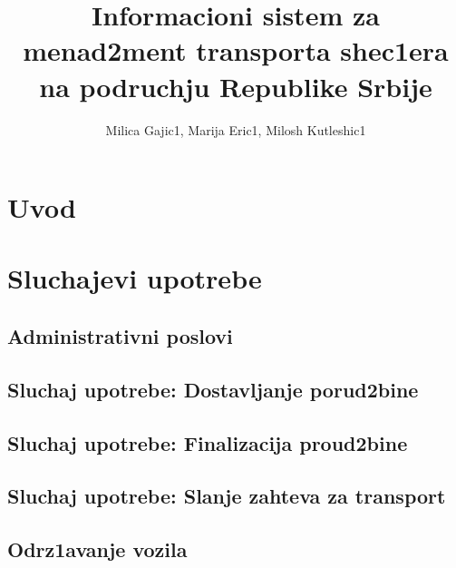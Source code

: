 \documentclass{article}
\title{Informacioni sistem za menad2ment transporta shec1era na podruchju Republike Srbije}
\author{Milica Gajic1, Marija Eric1, Milosh Kutleshic1}
\begin{document}
\maketitle
\newpage


\renewcommand*\contentsname{Sadrz1aj}
\tableofcontents
\newpage

\section{Uvod}

\section{Sluchajevi upotrebe}
\subsection{Administrativni poslovi}



\subsection{Sluchaj upotrebe: Dostavljanje porud2bine}

\subsection{Sluchaj upotrebe: Finalizacija proud2bine}


\subsection{Sluchaj upotrebe: Slanje zahteva za transport}


\subsection{Odrz1avanje vozila}


\nocite{*}
\selectfont



\end{document}
